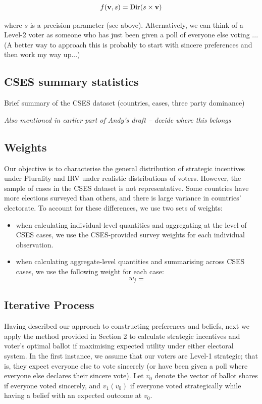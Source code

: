 \documentclass[12pt, letter]{article}
\begin{document}
\begin{equation}
	f({\bf v}, s) = \text{Dir}(s \times {\bf v})
\end{equation}

where $s$ is a precision parameter (see above). Alternatively, we can think of a Level-2 voter as someone who has just been given a poll of everyone else voting ...(A better way to approach this is probably to start with sincere preferences and then work my way up...)

\subsection{CSES summary statistics}

Brief summary of the CSES dataset (countries, cases, three party dominance)

\emph{Also mentioned in earlier part of Andy's draft -- decide where this belongs}

\subsection{Weights}

Our objective is to characterise the general distribution of strategic incentives under Plurality and IRV under realistic distributions of voters. However, the sample of cases in the CSES dataset is not representative. Some countries have more elections surveyed than others, and there is large variance in countries' electorate. To account for these differences, we use two sets of weights:

\begin{itemize}
	\item when calculating individual-level quantities and aggregating at the level of CSES cases, we use the CSES-provided survey weights for each individual observation.
	\item when calculating aggregate-level quantities and summarising across CSES cases, we use the following weight for each case:
	\begin{equation}
		w_j \equiv 
	\end{equation}
\end{itemize}

\subsection{Iterative Process}

Having described our approach to constructing preferences and beliefs, next we apply the method provided in Section 2 to calculate strategic incentives and voter's optimal ballot if maximising expected utility under either electoral system. In the first instance, we assume that our voters are Level-1 strategic; that is, they expect everyone else to vote sincerely (or have been given a poll where everyone else declares their sincere vote). Let $v_0$ denote the vector of ballot shares if everyone voted sincerely, and $v_1(v_0)$ if everyone voted strategically while having a belief with an expected outcome at $v_0$. 
\end{document}
